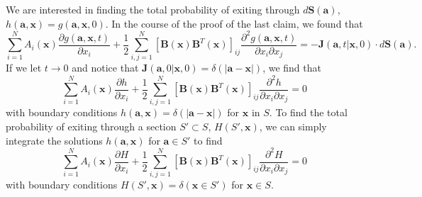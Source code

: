 \documentclass{article}
\newcommand{\mb}{\mathbf}
\begin{document}
We are interested in finding the total probability of exiting through $d{\mb S}({\mb a})$, $h({\mb a},{\mb x})=g({\mb a},{\mb x},0)$.  In the course of the proof of the last claim, we found that
\begin{equation*}
\sum_{i=1}^NA_i({\mb x})\frac{\partial g({\mb a},{\mb x},t)}{\partial x_i}+\frac{1}{2}\sum_{i,j=1}^N[{\mb B}({\mb x}){\mb B}^T({\mb x})]_{ij}\frac{\partial ^2 g({\mb a},{\mb x},t)}{\partial x_i\partial x_j}=-{\mb J}({\mb a},t|{\mb x},0)\cdot d{\mb S}({\mb a}).
\end{equation*}
If we let $t\to 0$ and notice that ${\mb J}({\mb a},0|{\mb x},0)=\delta(|{\mb a}-{\mb x}|)$, we find that 
\begin{equation*}
\sum_{i=1}^NA_i({\mb x})\frac{\partial h}{\partial x_i}+\frac{1}{2}\sum_{i,j=1}^N[{\mb B}({\mb x}){\mb B}^T({\mb x})]_{ij}\frac{\partial ^2 h}{\partial x_i\partial x_j}=0
\end{equation*}
with boundary conditions $h({\mb a},{\mb x})=\delta(|{\mb a}-{\mb x}|)$ for ${\mb x}$ in $S$. To find the total probability of exiting through a section $S'\subset S$, $H(S',{\mb x})$, we can simply integrate the solutions $h({\mb a},{\mb x})$ for ${\mb a}\in S'$ to find 
\begin{equation*}
\sum_{i=1}^NA_i({\mb x})\frac{\partial H}{\partial x_i}+\frac{1}{2}\sum_{i,j=1}^N[{\mb B}({\mb x}){\mb B}^T({\mb x})]_{ij}\frac{\partial ^2 H}{\partial x_i\partial x_j}=0 %
\end{equation*}
with boundary conditions $H(S',{\mb x})=\delta({\mb x}\in S')$ for ${\mb x}\in S$.
\end{document}

